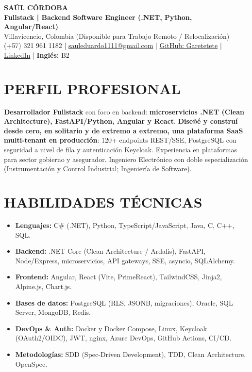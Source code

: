 \documentclass[letterpaper,10pt]{article}
\begin{document}
\begin{center}
    {\Huge \bfseries SAÚL CÓRDOBA} \\[3pt]
    {\Large \textbf{Fullstack | Backend Software Engineer (.NET, Python, Angular/React)}} \\[2pt]
    Villavicencio, Colombia (Disponible para Trabajo Remoto / Relocalización) \\
    (+57) 321 961 1182 | \href{mailto:sauleduardo1111@gmail.com}{sauleduardo1111@gmail.com} | \href{https://github.com/Garetetete}{GitHub: Garetetete} | \href{https://www.linkedin.com/in/saul-cordoba-a2997427b}{LinkedIn} | \textbf{Inglés:} B2
\end{center}

\section{PERFIL PROFESIONAL}
\textbf{Desarrollador Fullstack} con foco en backend: \textbf{microservicios .NET (Clean Architecture), FastAPI/Python, Angular y React}. \textbf{Diseñé y construí desde cero, en solitario y de extremo a extremo, una plataforma SaaS multi-tenant en producción}: 120+ endpoints REST/SSE, PostgreSQL con seguridad a nivel de fila y autenticación Keycloak. Experiencia en plataformas para sector gobierno y asegurador. Ingeniero Electrónico con doble especialización (Instrumentación y Control Industrial; Ingeniería de Software).

\section{HABILIDADES TÉCNICAS}
\begin{itemize}
    \item \textbf{Lenguajes:} C\# (.NET), Python, TypeScript/JavaScript, Java, C, C++, SQL.
    \item \textbf{Backend:} .NET Core (Clean Architecture / Ardalis), FastAPI, Node/Express, microservicios, API gateways, SSE, asyncio, SQLAlchemy.
    \item \textbf{Frontend:} Angular, React (Vite, PrimeReact), TailwindCSS, Jinja2, Alpine.js, Chart.js.
    \item \textbf{Bases de datos:} PostgreSQL (RLS, JSONB, migraciones), Oracle, SQL Server, MongoDB, Redis.
    \item \textbf{DevOps \& Auth:} Docker y Docker Compose, Linux, Keycloak (OAuth2/OIDC), JWT, nginx, Azure DevOps, GitHub Actions, CI/CD.
    \item \textbf{Metodologías:} SDD (Spec-Driven Development), TDD, Clean Architecture, OpenSpec.
\end{itemize}
\end{document}
